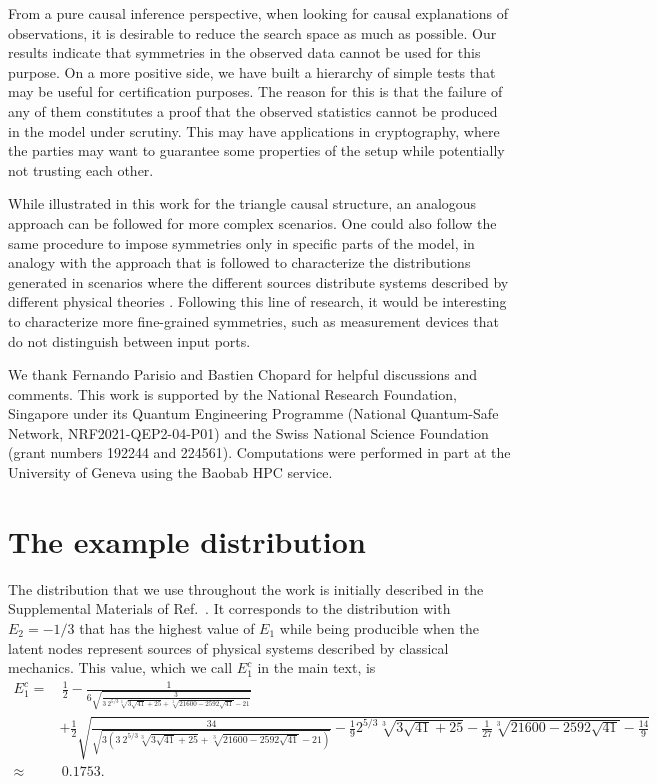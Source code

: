 \documentclass[aps,physrev,reprint,superscriptaddress,nofootinbib,twocolumn]{revtex4-2}
\begin{document}
From a pure causal inference perspective, when looking for causal explanations of observations, it is desirable to reduce the search space as much as possible.
Our results indicate that symmetries in the observed data cannot be used for this purpose.
On a more positive side, we have built a hierarchy of simple tests that may be useful for certification purposes.
The reason for this is that the failure of any of them constitutes a proof that the observed statistics cannot be produced in the model under scrutiny.
This may have applications in cryptography, where the parties may want to guarantee some properties of the setup while potentially not trusting each other.

While illustrated in this work for the triangle causal structure, an analogous approach can be followed for more complex scenarios.
One could also follow the same procedure to impose symmetries only in specific parts of the model, in analogy with the approach that is followed to characterize the distributions generated in scenarios where the different sources distribute systems described by different physical theories \cite{wolfe2021,pozas2022}.
Following this line of research, it would be interesting to characterize more fine-grained symmetries, such as measurement devices that do not distinguish between input ports.

\acknowledgments
We thank Fernando Parisio and Bastien Chopard for helpful discussions and comments.
This work is supported by the National Research Foundation, Singapore under its Quantum Engineering Programme (National Quantum-Safe Network, NRF2021-QEP2-04-P01) and the Swiss National Science Foundation (grant numbers 192244 and 224561).
Computations were performed in part at the University of Geneva using the Baobab HPC service.

\appendix
\onecolumngrid
\section{The example distribution}
\label{app:E_1c}
The distribution that we use throughout the work is initially described in the Supplemental Materials of Ref.~\cite{gisin2020}.
It corresponds to the distribution with $E_2=-1/3$ that has the highest value of $E_1$ while being producible when the latent nodes represent sources of physical systems described by classical mechanics.
This value, which we call $E_1^c$ in the main text, is
\begin{equation*}
    \begin{aligned}
        E_1^c=&\,\frac{1}{2} 
        -\frac{1}{6\sqrt{\frac{3}{3\ 2^{5/3}\sqrt[3]{3\sqrt{41} + 25} + \sqrt[3]{21600 - 2592\sqrt{41}} - 21}}} \\
        &+ \frac{1}{2}\sqrt{\frac{34}{\sqrt{3\left(3\ 2^{5/3}\sqrt[3]{3\sqrt{41} + 25} + \sqrt[3]{21600 - 2592\sqrt{41}} - 21 \right)}}-\frac{1}{9} 2^{5/3}\sqrt[3]{3\sqrt{41} + 25} - \frac{1}{27}\sqrt[3]{21600 - 2592\sqrt{41}} - \frac{14}{9}}\\
        \approx&\,0.1753.
   \end{aligned}
\end{equation*}
\end{document}
